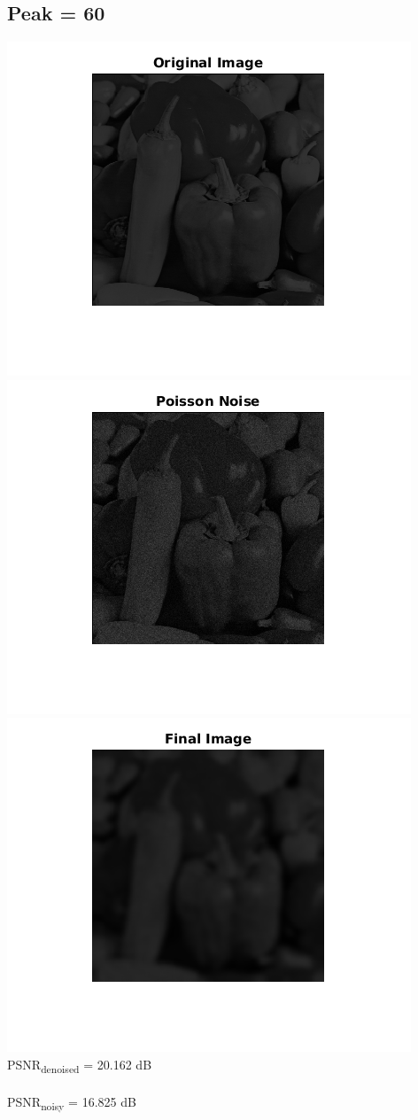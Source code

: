\documentclass{article}
\begin{document}
\subsection*{Peak = 60}
\includegraphics[scale=0.5]{images/peak60_orig}
\includegraphics[scale=0.5]{images/peak60_noisy}
\includegraphics[scale=0.5]{images/peak60_denoised}
\\
PSNR\textsubscript{denoised} = 20.162 dB\\
\\
PSNR\textsubscript{noisy} = 16.825 dB
\end{document}
